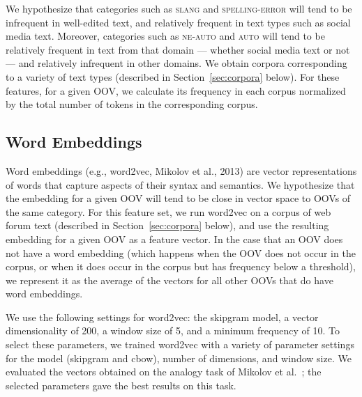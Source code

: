 \documentclass[10pt, a4paper]{article}
\newcommand{\secref}[2][]{Section#1~\ref{#2}\xspace}
\begin{document}
We hypothesize that categories such as \textsc{slang} and
\textsc{spelling-error} will tend to be infrequent in well-edited
text, and relatively frequent in text types such as social media
text. Moreover, categories such as \textsc{ne-auto} and \textsc{auto}
will tend to be relatively frequent in text from that domain ---
whether social media text or not --- and relatively infrequent in
other domains. We obtain corpora corresponding to a variety of text
types (described in \secref{sec:corpora} below). For these features,
for a given OOV, we calculate its frequency in each corpus normalized
by the total number of tokens in the corresponding corpus.

\subsection{Word Embeddings\label{sec:features:embeddings}}

Word embeddings (e.g., word2vec, Mikolov et al., 2013) are vector
representations of words that capture aspects of their syntax and
semantics. We hypothesize that the embedding for a given OOV will tend
to be close in vector space to OOVs of the same category. For this
feature set, we run word2vec on a corpus of web forum text (described
in \secref{sec:corpora} below), and use the resulting embedding for a
given OOV as a feature vector. In the case that an OOV does not have a
word embedding (which happens when the OOV does not occur in the
corpus, or when it does occur in the corpus but has frequency below a
threshold), we represent it as the average of the vectors for all
other OOVs that do have word embeddings.



We use the following settings for word2vec: the skipgram model, a
vector dimensionality of 200, a window size of 5, and a minimum
frequency of 10. To select these parameters, we trained word2vec with
a variety of parameter settings for the model (skipgram and cbow),
number of dimensions, and window size. We evaluated the vectors
obtained on the analogy task of Mikolov et
al.\ ; the selected parameters gave the best
results on this task.



\end{document}
